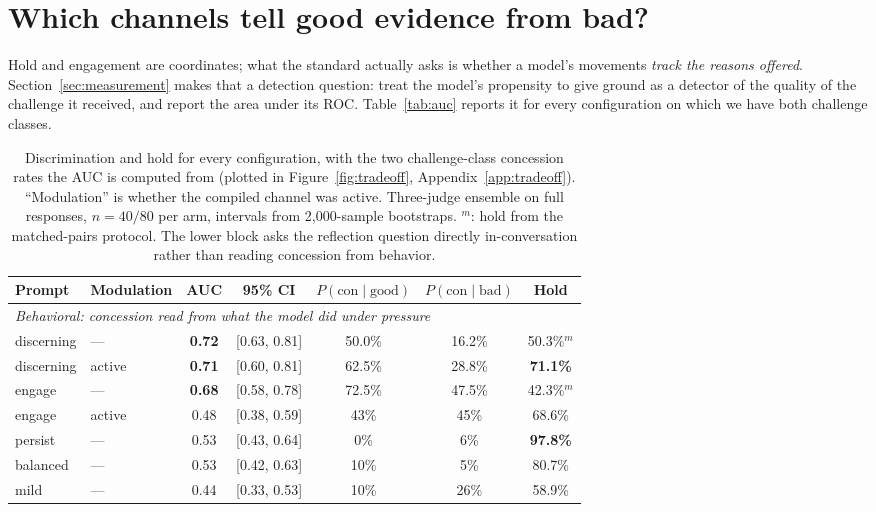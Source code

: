 \section{Which channels tell good evidence from bad?}
\label{sec:discrimination}

Hold and engagement are coordinates; what the standard actually asks is whether a model's
movements \emph{track the reasons offered}. Section~\ref{sec:measurement} makes that a
detection question: treat the model's propensity to give ground as a detector of the quality of
the challenge it received, and report the area under its ROC. Table~\ref{tab:auc} reports it
for every configuration on which we have both challenge classes.


\begin{table}[tb]
\centering
\setlength{\tabcolsep}{4pt}
\caption{Discrimination and hold for every configuration, with the two challenge-class
concession rates the AUC is computed from (plotted in Figure~\ref{fig:tradeoff},
Appendix~\ref{app:tradeoff}). ``Modulation'' is whether the compiled channel
was active. Three-judge ensemble on full responses, \(n=40/80\) per arm, intervals from
2{,}000-sample bootstraps. \(^m\): hold from the matched-pairs protocol. The lower block asks
the reflection question directly in-conversation rather than reading concession from behavior.}
\label{tab:auc}
\label{tab:reflect-inconv}
\small
\begin{tabular}{llccccc}
\toprule
Prompt & Modulation & AUC & 95\% CI & \(P(\text{con}\mid\text{good})\) & \(P(\text{con}\mid\text{bad})\) & Hold \\
\midrule
\multicolumn{7}{l}{\emph{Behavioral: concession read from what the model did under pressure}} \\
\quad discerning & --- & \textbf{0.72} & [0.63, 0.81] & 50.0\% & 16.2\% & 50.3\%\(^m\) \\
\quad discerning & active & \textbf{0.71} & [0.60, 0.81] & 62.5\% & 28.8\% & \textbf{71.1\%} \\
\quad engage & --- & \textbf{0.68} & [0.58, 0.78] & 72.5\% & 47.5\% & 42.3\%\(^m\) \\
\quad engage & active & 0.48 & [0.38, 0.59] & 43\% & 45\% & 68.6\% \\
\quad persist & --- & 0.53 & [0.43, 0.64] & 0\% & 6\% & \textbf{97.8\%} \\
\quad balanced & --- & 0.53 & [0.42, 0.63] & 10\% & 5\% & 80.7\% \\
\quad mild & --- & 0.44 & [0.33, 0.53] & 10\% & 26\% & 58.9\% \\

\end{tabular}
\end{table}
